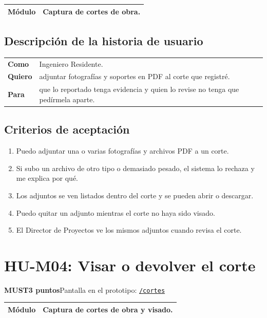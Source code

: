 \documentclass[11pt]{article}
\newcommand{\urlapp}{https://thankstochatgpt.github.io/LOARD}
\newcommand{\app}[1]{\href{\urlapp#1}{\texttt{#1}}}
\newcommand{\etiqueta}[1]{\colorbox{barra}{\textbf{\color{marca}#1}}}
\begin{document}
\begin{tabular}{>{\bfseries}p{2.4cm} p{13.4cm}}
\toprule
Módulo & Captura de cortes de obra. \\
\bottomrule
\end{tabular}

\subsection*{Descripción de la historia de usuario}

\begin{tabular}{>{\bfseries}p{2.4cm} p{13.4cm}}
\toprule
Como & Ingeniero Residente. \\
Quiero & adjuntar fotografías y soportes en PDF al corte que registré. \\
Para & que lo reportado tenga evidencia y quien lo revise no tenga que pedírmela aparte. \\
\bottomrule
\end{tabular}

\subsection*{Criterios de aceptación}

\begin{enumerate}
\item Puedo adjuntar una o varias fotografías y archivos PDF a un corte.
\item Si subo un archivo de otro tipo o demasiado pesado, el sistema lo rechaza y me explica por qué.
\item Los adjuntos se ven listados dentro del corte y se pueden abrir o descargar.
\item Puedo quitar un adjunto mientras el corte no haya sido visado.
\item El Director de Proyectos ve los mismos adjuntos cuando revisa el corte.
\end{enumerate}


\newpage
\section*{HU-M04: Visar o devolver el corte}
\etiqueta{MUST}\quad\etiqueta{3 puntos}\quad Pantalla en el prototipo: \app{/cortes}

\begin{tabular}{>{\bfseries}p{2.4cm} p{13.4cm}}
\toprule
Módulo & Captura de cortes de obra y visado. \\
\bottomrule
\end{tabular}
\end{document}
